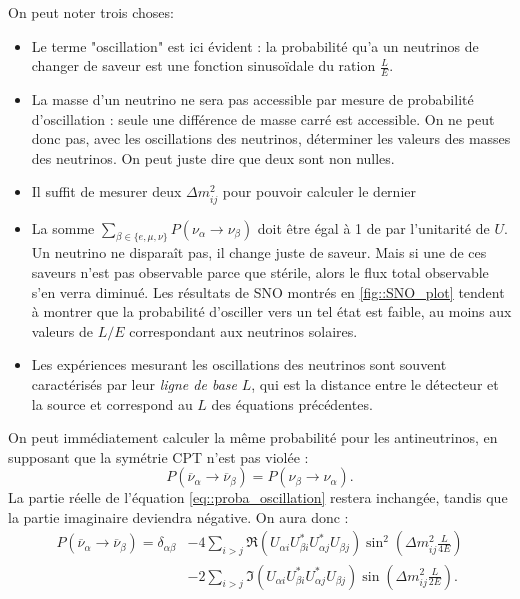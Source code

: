             On peut noter trois choses:
            \begin{itemize}
                \item Le terme "oscillation" est ici évident : la probabilité qu'a un neutrinos de changer de saveur est une fonction sinusoïdale du ration $\frac{L}{E}$. 
                \item La masse d'un neutrino ne sera pas accessible par mesure de probabilité d'oscillation : seule une différence de masse carré est accessible. On ne peut donc pas, avec les oscillations des neutrinos, déterminer les valeurs des masses des neutrinos. On peut juste dire que deux sont non nulles.
                \item Il suffit de mesurer deux $\Delta m_{ij}^2$ pour pouvoir calculer le dernier
                \item La somme $\sum_{\beta\in\{e,\mu,\nu\}}P(\nu_{\alpha}\to\nu_{\beta})$ doit être égal à 1 de par l'unitarité de $U$. Un neutrino ne disparaît pas, il change juste de saveur. Mais si une de ces saveurs n'est pas observable parce que stérile, alors le flux total observable s'en verra diminué. Les résultats de SNO montrés en \autoref{fig::SNO_plot} tendent à montrer que la probabilité d'osciller vers un tel état est faible, au moins aux valeurs de $L/E$ correspondant aux neutrinos solaires.
                \item Les expériences mesurant les oscillations des neutrinos sont souvent caractérisés par leur \textit{ligne de base} $L$, qui est la distance entre le détecteur et la source et correspond au $L$ des équations précédentes.
            \end{itemize}
            
            On peut immédiatement calculer la même probabilité pour les antineutrinos, en supposant que la symétrie CPT n'est pas violée : 
            \begin{equation}
                P(\overline{\nu}_{\alpha}\to\overline{\nu}_{\beta}) = P(\nu_{\beta}\to\nu_{\alpha}).
            \end{equation}
            La partie réelle de l'équation \eqref{eq::proba_oscillation} restera inchangée, tandis que la partie imaginaire deviendra négative. On aura donc :
            \begin{equation}
                \begin{split}
                    P(\overline{\nu}_{\alpha}\to\overline{\nu}_{\beta}) = \delta_{\alpha\beta} & - 4\sum_{i>j}\Re(U_{\alpha i}U_{\beta i}^*U_{\alpha j}^*U_{\beta j})\sin^2\left(\Delta m_{ij}^2\frac{L}{4E}\right) \\
                    & -2\sum_{i>j}\Im(U_{\alpha i}U_{\beta i}^*U_{\alpha j}^*U_{\beta j})\sin\left(\Delta m_{ij}^2\frac{L}{2E}\right).
                \end{split}
            \end{equation}
            

